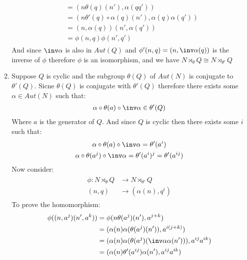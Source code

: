 \begin{enumerate}[label=\ilabel]
\begin{gather*}
\begin{split}
                &= (n \theta(q)(n'), \alpha(qq')) \\
                &= (n \theta'(q) \circ \alpha(q)(n'), \alpha(q) \alpha(q')) \\
                &= (n, \alpha(q))(n', \alpha(q')) \\
                &= \phi(n, q) \phi(n', q')
            \end{split}
        \end{gather*}
        And since $\inv \alpha$ is also in $Aut(Q)$ and $\phi'(n, q) = (n, \inv \alpha(q))$ is the inverse of $\phi$ therefore $\phi$ is an isomorphism, and we have $N \rtimes_\theta Q \cong N \rtimes_{\theta'} Q$
    \item
        Suppose $Q$ is cyclic and the subgroup $\theta(Q)$ of $Aut(N)$ is conjugate to $\theta'(Q)$. Sicne $\theta(Q)$ is conjugate with $\theta'(Q)$ therefore there exists some $\alpha \in Aut(N)$ such that:
        \begin{gather*}
            \alpha \circ \theta(a) \circ \inv \alpha \in \theta'(Q)
        \end{gather*}
        Where $a$ is the generator of $Q$. And since $Q$ is cyclic then there exists some $i$ such that:
        \begin{gather*}
            \alpha \circ \theta(a) \circ \inv \alpha = \theta'(a^i) \\
            \alpha \circ \theta(a^j) \circ \inv \alpha = \theta'(a^i)^j = \theta'(a^{ij})
        \end{gather*}
        Now consider:
        \begin{gather*}
            \begin{split}
                \phi: N \rtimes_\theta Q &\to N \rtimes_{\theta'} Q \\
                (n, q) &\to (\alpha(n), q^i)
            \end{split}
        \end{gather*}
        To prove the homomorphism:
        \begin{gather*}
            \begin{split}
                \phi((n, a^j)(n', a^k)) &= \phi(n \theta(a^j)(n'), a^{j + k}) \\
                &= (\alpha(n) \alpha(\theta(a^j)(n')), a^{i(j+k)}) \\
                &= (\alpha(n) \alpha(\theta(a^j)(\inv \alpha \alpha(n'))), a^{ij} a^{ik}) \\
                &= (\alpha(n) \theta'(a^{ij}) \alpha(n'), a^{ij}a^{ik}) \\

\end{split}
\end{gather*}
\end{enumerate}
